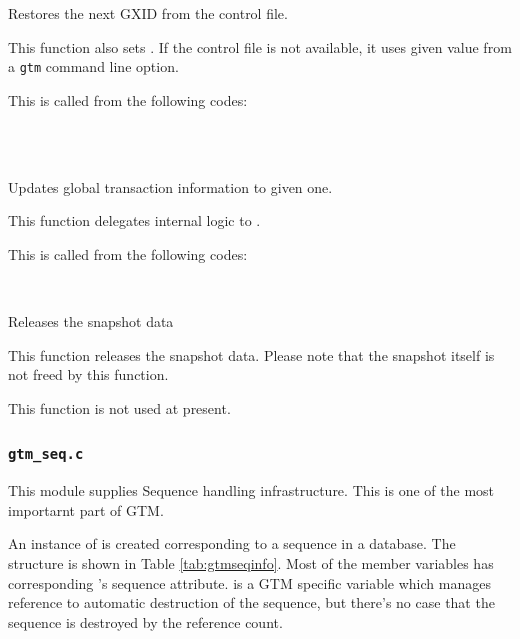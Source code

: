   
    Restores the next GXID from the control file.
    
    This function also sets .
    If the control file is not available, it uses given value
	from a \texttt{gtm} command line option.
    
    This is called from the following codes:
    
    \FuncRefHdr
		\\
		\\ \hline
    \FuncRefTrailor
  
  
    Updates global transaction information to given one.
    
    This function delegates internal logic to  .
    
    This is called from the following codes:
    
	{
		\footnotesize
		\FuncRefHdr
			\\ \hline
		\FuncRefTrailor
	}
  
  
  
    Releases the snapshot data
    
    This function releases the snapshot data.
    Please note that the snapshot itself is not freed by this function.
    
    This function is not used at present.




\subsubsection{\texttt{gtm\_seq.c}}

  This module supplies Sequence handling infrastructure.
  This is one of the most importarnt part of GTM.
  
  An instance of { } is created corresponding to a sequence in a database.
  The structure is shown in Table \ref{tab:gtmseqinfo}.
  Most of the member variables has corresponding \PG's sequence attribute.
   is a GTM specific variable which manages reference to automatic
  destruction of the sequence, but there's no case that the sequence is destroyed by
  the reference count.
  
